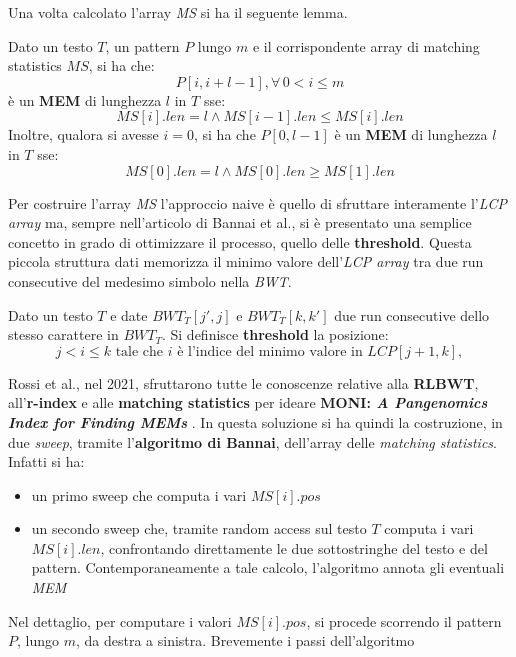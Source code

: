 \noindent
Una volta calcolato l'array \textit{MS} si ha il seguente lemma.
\begin{lemma}
  Dato un testo $T$, un pattern $P$ lungo $m$ e il
  corrispondente array di matching statistics $MS$, si ha che:
  \[P[i,i+l-1],\forall\, 0<i\leq m\]
  è un \textbf{MEM} di lunghezza $l$ in $T$ sse:
  \[MS[i].len=l\land MS[i-1].len\leq MS[i].len\]
  Inoltre, qualora si avesse $i=0$, si ha che $P[0,l-1]$ è un \textbf{MEM} di
  lunghezza $l$ in $T$ sse:
  \begin{equation}
    \label{eq:ms2}
    MS[0].len=l\land MS[0].len\geq MS[1].len
  \end{equation}
\end{lemma}
Per costruire l'array \textit{MS} l'approccio naive è quello di sfruttare
interamente l'\textit{LCP array} ma, sempre nell'articolo di Bannai et
al.\cite{bannai}, si è presentato una semplice concetto in grado di
ottimizzare il processo, quello delle \textbf{threshold}. Questa piccola
struttura dati memorizza il minimo valore dell'\textit{LCP array} tra due run
consecutive del medesimo simbolo nella \textit{BWT}.
\begin{definizione}
  Dato un testo $T$ e date $BWT_T[j',j]$ e $BWT_T[k,k']$ due run consecutive
  dello stesso carattere in $BWT_T$. Si definisce \textbf{threshold} la
  posizione:
  \[j< i \leq k\mbox{ tale che } i\mbox{ è l'indice del minimo valore in
    }LCP[j+1,k],\] 
\end{definizione}
Rossi et al., nel 2021, sfruttarono tutte le conoscenze relative
alla \textbf{RLBWT}, all'\textbf{r-index} e alle \textbf{matching statistics}
per ideare \textbf{MONI:\textit{ A Pangenomics Index for Finding MEMs}}
\cite{moni}. In questa soluzione si ha quindi la costruzione, in due
\textit{sweep}, tramite l'\textbf{algoritmo di Bannai}, dell'array delle
\textit{matching statistics}. Infatti si ha:
\begin{itemize}
  \item un primo sweep che computa i vari $MS[i].pos$
  \item un secondo sweep che, tramite random access sul testo $T$ computa i
  vari $MS[i].len$, confrontando direttamente le due sottostringhe del testo e
  del pattern. Contemporaneamente a tale calcolo, l'algoritmo annota gli
  eventuali \textit{MEM}
\end{itemize}
Nel dettaglio, per computare i valori $MS[i].pos$, si procede scorrendo il
pattern $P$, lungo $m$, da destra a sinistra. Brevemente i passi dell'algoritmo
